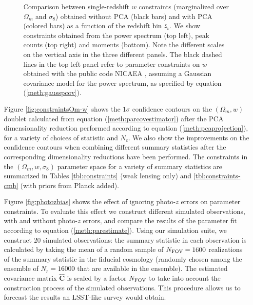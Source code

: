 \documentclass[reprint,aps,prd,superscriptaddress,showkeys,showpacs]{revtex4-1}
\newcommand{\bbh}[1]{\mathbf{\hat{#1}}}
\begin{document}
\begin{figure}
\caption{Comparison between single-redshift $w$ constraints (marginalized over $\Omega_m$ and $\sigma_8$) obtained without PCA (black bars) and with PCA (colored bars) as a function of the redshift bin $\bar{z}_b$. We show constraints obtained from the power spectrum (top left), peak counts (top right) and moments (bottom). Note the different scales on the vertical axis in the three different panels. The black dashed lines in the top left panel refer to parameter constraints on $w$ obtained with the public code NICAEA \citep{Nicaea}, assuming a Gaussian covariance model for the power spectrum, as specified by equation (\ref{meth:gausspcov}).}
\label{fig:nopca}
\end{figure}

Figure \ref{fig:constraintsOm-w} shows the $1\sigma$ confidence contours on the $(\Omega_m,w)$ doublet calculated from equation (\ref{meth:parcovestimator}) after the PCA dimensionality reduction performed according to equation (\ref{meth:pcaprojection}), for a variety of choices of statistic and $N_c$. We also show the improvements on the confidence contours when combining different summary statistics after the corresponding dimensionality reductions have been performed. The constraints in the $(\Omega_m,w,\sigma_8)$ parameter space for a variety of summary statistics are summarized in Tables \ref{tbl:constraints} (weak lensing only) and \ref{tbl:constraints-cmb} (with priors from Planck added). 

Figure \ref{fig:photozbias} shows the effect of ignoring photo-$z$ errors on parameter constraints. To evaluate this effect we construct different simulated observations, with and without photo-$z$ errors, and compare the results of the parameter fit according to equation (\ref{meth:parestimate}). Using our simulation suite, we construct 20 simulated observations: the summary statistic in each observation is calculated by taking the mean of a random sample of $N_{\rm FOV}=1600$ realizations of the summary statistic in the fiducial cosmology (randomly chosen among the ensemble of $N_r=16000$ that are available in the ensemble). The estimated covariance matrix $\bbh{C}$ is scaled by a factor $N_{\rm FOV}$ to take into account the construction process of the simulated observations. This procedure allows us to forecast the results an LSST-like survey would obtain.        
\end{document}

